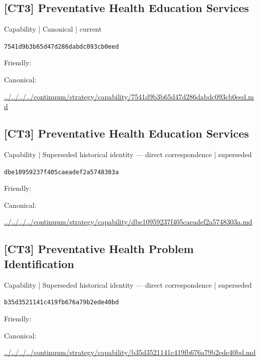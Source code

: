 \documentclass[10pt,a4paper]{article}
\begin{document}
\subsection*{[CT3] Preventative Health Education Services}
{\small Capability | Canonical | current}\par
\texttt{7541d9b3b65d47d286dabdc093cb0eed}\par
Friendly: \par
Canonical: \par
{\footnotesize\url{../../../../continuum/strategy/capability/7541d9b3b65d47d286dabdc093cb0eed.md}}\par
\subsection*{[CT3] Preventative Health Education Services}
{\small Capability | Superseded historical identity — direct correspondence | superseded}\par
\texttt{dbe10959237f405caeadef2a5748303a}\par
Friendly: \par
Canonical: \par
{\footnotesize\url{../../../../continuum/strategy/capability/dbe10959237f405caeadef2a5748303a.md}}\par
\subsection*{[CT3] Preventative Health Problem Identification}
{\small Capability | Superseded historical identity — direct correspondence | superseded}\par
\texttt{b35d3521141c419fb676a79b2ede40bd}\par
Friendly: \par
Canonical: \par
{\footnotesize\url{../../../../continuum/strategy/capability/b35d3521141c419fb676a79b2ede40bd.md}}\par
\end{document}
